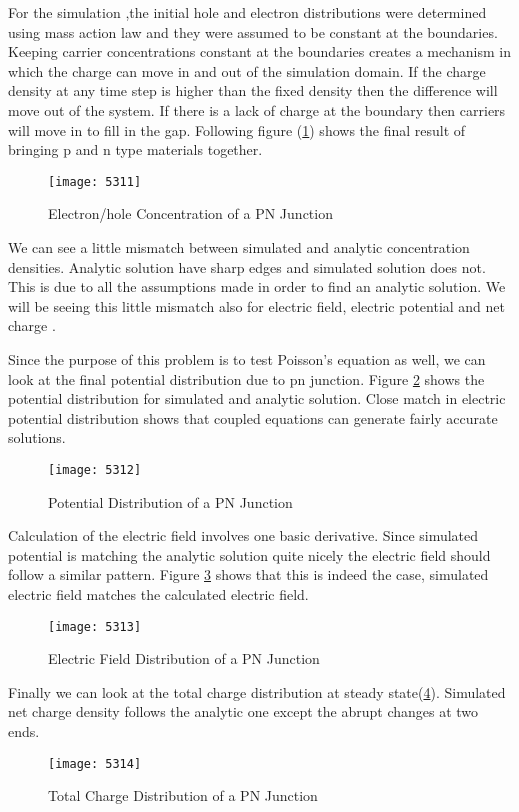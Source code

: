 For the simulation ,the initial hole and electron distributions were determined using mass action law and they were assumed to be constant at the boundaries. Keeping carrier concentrations constant at the boundaries creates a mechanism in which the charge can move in and out of the simulation domain. If the charge density at any time step is higher than the fixed density then the difference will move out of the system. If there is a lack of charge at the boundary then carriers will move in to fill in the gap. Following figure (\ref{npcon}) shows the final result of bringing p and n type materials together. 
 
\begin{figure}[ht]
\centering
\texttt{[image: 5311]}
\caption{Electron/hole Concentration of a PN Junction} 
\label{npcon}
\end{figure}

We can see a little mismatch between simulated and analytic concentration densities. Analytic solution have sharp edges and simulated solution does not. This is due to all the assumptions made in order to find an analytic solution. We will be seeing this little mismatch also for electric field, electric potential and net charge .

Since the purpose of this problem is to test Poisson's equation as well, we can look at the final potential distribution due to pn junction. Figure \ref{pnpot} shows the potential distribution for simulated and analytic solution. Close match in electric potential distribution shows that coupled equations can generate fairly accurate solutions.
 
\begin{figure}[!htp]
\centering
\texttt{[image: 5312]}
\caption{Potential Distribution of a PN Junction} 
\label{pnpot}
\end{figure}

Calculation of the electric field involves one basic derivative. Since simulated potential is matching the analytic solution quite nicely the electric field should follow a similar pattern. Figure \ref{pnefield} shows that this is indeed the case, simulated electric field matches the calculated electric field.
\begin{figure}[!htp]
\centering
\texttt{[image: 5313]}
\caption{Electric Field Distribution of a PN Junction} 
\label{pnefield}
\end{figure}

Finally we can look at the total charge distribution at steady state(\ref{pncd}). Simulated net charge density follows the analytic one except the abrupt changes at two ends. 
\begin{figure}
\centering
\texttt{[image: 5314]}
\caption{Total Charge Distribution of a PN Junction} 
\label{pncd}
\end{figure}




